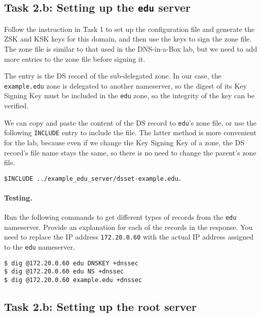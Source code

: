 \subsection{Task 2.b: Setting up the \texttt{edu} server} 

Follow the instruction in Task 1 to set up the configuration 
file and generate the ZSK and KSK keys 
for this domain, and then use the keys to sign
the zone file. The zone file is similar to that used 
in the DNS-in-a-Box lab, but we need to add more 
entries to the zone file before signing it. 


The entry is the DS record of the sub-delegated zone. 
In our case, the \texttt{example.edu} zone is delegated to 
another nameserver, so the digest of its Key Signing Key must 
be included in the \texttt{edu} zone, so the 
integrity of the key can be verified. 


We can copy and paste the content of the DS record to 
\texttt{edu}'s zone file, or use the following
\texttt{INCLUDE} entry to include the file. The latter 
method is more convenient for the lab, because even if we 
change the Key Signing Key of a zone, the DS record's file name stays the same,
so there is no need to change the parent's zone file.

\begin{lstlisting}
$INCLUDE ../example_edu_server/dsset-example.edu.
\end{lstlisting}
 

\paragraph{Testing.} 
Run the following commands to get different types of records
from the \texttt{edu} nameserver. Provide an explanation
for each of the records in the response. You need to
replace the IP address \texttt{172.20.0.60} with the actual
IP address assigned to the \texttt{edu} nameserver.


\begin{lstlisting}
$ dig @172.20.0.60 edu DNSKEY +dnssec
$ dig @172.20.0.60 edu NS +dnssec
$ dig @172.20.0.60 example.edu +dnssec
\end{lstlisting}



\subsection{Task 2.b: Setting up the root server} 


